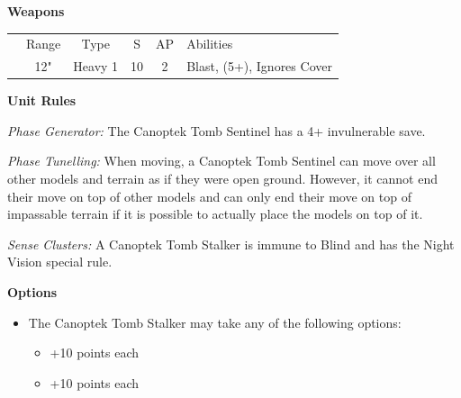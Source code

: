 \begin{minipage}[t]{0.72\textwidth}
	\vspace*{2em}
	\textbf{Weapons}
	
	\begin{tabular}{m{95 pt} *{4}{c} >{\raggedright\arraybackslash}p{130pt}}
		& Range & Type & S & AP & Abilities \\
		\quickref{Exile Cannon} & 12" & Heavy 1 & 10 & 2 & Blast, \quickref{Exile Ray} (5+), Ignores Cover \\
	\end{tabular}
	
	\vspace*{2em}
	\textbf{Unit Rules}
	
	\textit{Phase Generator:} The Canoptek Tomb Sentinel has a 4+ invulnerable save.
	
	\textit{Phase Tunelling:} When moving, a Canoptek Tomb Sentinel can move over all other models and terrain as if they were open ground. However, it cannot end their move on top of other models and can only end their move on top of impassable terrain if it is possible to actually place the models on top of it.
	
	\textit{Sense Clusters:} A Canoptek Tomb Stalker is immune to Blind and has the Night Vision special rule.	
	
	\vspace*{2em}
	\textbf{Options}
	\begin{itemize}
		\item The Canoptek Tomb Stalker may take any of the following options:
		\begin{itemize}
			\item {} \dotfill +10 points each
			\item {} \dotfill +10 points each
		\end{itemize}
	\end{itemize}
\end{minipage}
\hspace{0.5em}


\newpage
\subsubsection[Canoptek Tomb Stalker]{}

